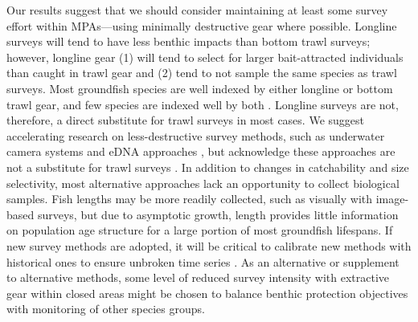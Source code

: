 \documentclass[12pt]{article}
\newcommand{\R}[1]{\label{#1}\linelabel{#1}}
\begin{document}
\begin{spacing}{1.4}
Our results suggest that we should consider maintaining at least some survey effort within MPAs---using minimally destructive gear where possible.
Longline surveys will tend to have less benthic impacts than bottom trawl surveys; however, longline gear (1) will tend to select for larger bait-attracted individuals than caught in trawl gear and (2) tend to not sample the same species as trawl surveys.
Most groundfish species are well indexed by either longline or bottom trawl gear, and few species are indexed well by both \citep[e.g.,][]{anderson2019synopsis}.
Longline surveys are not, therefore, a direct substitute for trawl surveys in most cases.
We suggest accelerating research on less-destructive survey methods, such as underwater camera systems
\citep[e.g.,][]{trenkel2004, rooper2012, bryan2023} and eDNA approaches \citep[e.g.,][]{rourke2022, he2023}, but acknowledge these approaches are not a \R{B18}substitute for trawl surveys \citep{benoit2020national}.
In addition to changes in catchability and size selectivity, most alternative approaches lack an opportunity to collect biological samples.
Fish lengths may be more readily collected, such as visually with image-based surveys, but due to asymptotic growth, length provides little information on population age structure for a large portion of most groundfish lifespans.
If new survey methods are adopted, it will be critical to calibrate new methods with historical ones to ensure unbroken time series \citep{field2006}.
As an alternative or supplement to alternative methods, some level of reduced survey intensity with extractive gear within closed areas might be chosen to balance benthic protection objectives with monitoring of other species groups.


\end{spacing}
\end{document}
